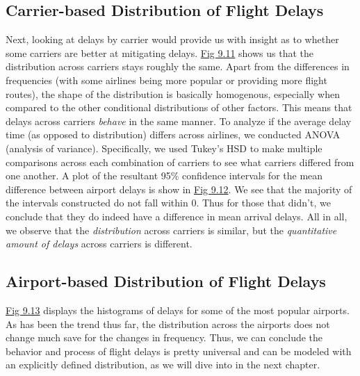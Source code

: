 \documentclass[12pt, a4paper, openany]{book}
\newcommand\tab[1][1cm]{\hspace*{#1}}
\begin{document}
		\subsection{Carrier-based Distribution of Flight Delays}
			
			\tab Next, looking at delays by carrier would provide us with insight as to whether some carriers are better at mitigating delays. \underline{Fig 9.11} shows us that the distribution across carriers stays roughly the same. Apart from the differences in frequencies (with some airlines being more popular or providing more flight routes), the shape of the distribution is basically homogenous, especially when compared to the other conditional distributions of other factors. This means that delays across carriers \textit{behave} in the same manner. To analyze if the average delay time (as opposed to distribution) differs across airlines, we conducted ANOVA (analysis of variance). Specifically, we used Tukey’s HSD to make multiple comparisons across each combination of carriers to see what carriers differed from one another. A plot of the resultant 95\% confidence intervals for the mean difference between airport delays is show in \underline{Fig 9.12}. We see that the majority of the intervals constructed do not fall within 0. Thus for those that didn’t, we conclude that they do indeed have a difference in mean arrival delays. All in all, we observe that the \textit{distribution} across carriers is similar, but the \textit{quantitative amount of delays} across carriers is different. \\

		\subsection{Airport-based Distribution of Flight Delays}
			
			\tab \underline{Fig 9.13} displays the histograms of delays for some of the most popular airports. As has been the trend thus far, the distribution across the airports does not change much save for the changes in frequency. Thus, we can conclude the behavior and process of flight delays is pretty universal and can be modeled with an explicitly defined distribution, as we will dive into in the next chapter. \\ 
\end{document}
